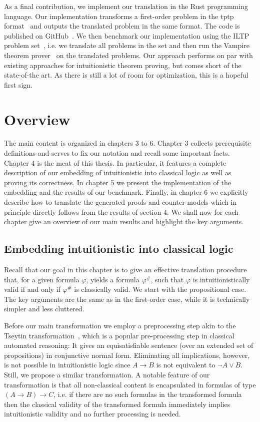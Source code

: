 \documentclass[a4paper,11pt]{report}
\theoremstyle{definition}
\theoremstyle{definition}
\theoremstyle{definition}
\theoremstyle{definition}
\theoremstyle{definition}
\theoremstyle{definition}
\theoremstyle{definition}
\begin{document}
	
	As a final contribution, we implement our translation in the Rust programming language. Our implementation transforms a first-order problem in the tptp format~\cite{tptp} and outputs the translated problem in the same format. The code is published on GitHub~\cite{implementation}. We then benchmark our implementation using the ILTP problem set~\cite{iltp}, i.e. we translate all problems in the set and then run the Vampire theorem prover~\cite{Kov_cs_2013} on the translated problems. Our approach performs on par with existing approaches for intuitionistic theorem proving, but comes short of the state-of-the art. As there is still a lot of room for optimization, this is a hopeful first sign.
	
	\chapter{Overview}

	The main content is organized in chapters 3 to 6. Chapter 3 collects prerequisite definitions and serves to fix our notation and recall some important facts. Chapter 4 is the meat of this thesis. In particular, it features a complete description of our embedding of intuitionistic into classical logic as well as proving its correctness. In chapter 5 we present the implementation of the embedding and the results of our benchmark. Finally, in chapter 6 we explicitly describe how to translate the generated proofs and counter-models which in principle directly follows from the results of section 4. 	We shall now for each chapter give an overview of our main results and highlight the key arguments. 

	\section{Embedding intuitionistic into classical logic}

	Recall that our goal in this chapter is to give an effective translation procedure that, for a given formula $\varphi$, yields a formula $\varphi^\#$, such that $\varphi$ is intuitionistically valid if and only if $\varphi^\#$ is classically valid. We start with the propositional case. The key arguments are the same as in the first-order case, while it is technically simpler and less cluttered.
	
	Before our main transformation we employ a preprocessing step akin to the Tseytin transformation~\cite{tseitin1983complexity}, which is a popular pre-processing step in classical automated reasoning:
	It gives an equisatisfiable sentence (over an extended set of propositions) in conjunctive normal form.
	Eliminating all implications, however, is not possible in intuitionistic logic since $A\to B$ is not equivalent to $\neg A\vee B$.
	Still, we propose a similar transformation.
	A notable feature of our transformation is that all non-classical content is encapsulated in formulas of type $(A\to B)\to C$, i.e. if there are no such formulas in the transformed formula then the classical validity of the transformed formula immediately implies intuitionistic validity and no further processing is needed.
	
\end{document}
